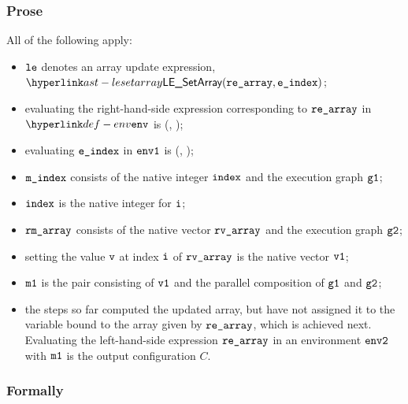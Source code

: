 \subsubsection{Prose}
All of the following apply:
\begin{itemize}
  \item $\vle$ denotes an array update expression, $\LESetArray(\rearray, \eindex)$;
  \item evaluating the right-hand-side expression corresponding to $\rearray$ in $\env$
  is \Normal(\rmarray, \envone)\ProseOrAbnormal;
  \item evaluating $\eindex$ in $\envone$ is \Normal(\mindex, \envtwo)\ProseOrAbnormal;
  \item $\mindex$ consists of the native integer $\vindex$ and the execution graph $\vgone$;
  \item $\vindex$ is the native integer for $\vi$;
  \item $\rmarray$ consists of the native vector $\rvarray$ and the execution graph $\vgtwo$;
  \item setting the value $\vv$ at index $\vi$ of $\rvarray$ is the native vector $\vvone$;
  \item $\vmone$ is the pair consisting of $\vvone$ and the parallel composition of $\vgone$ and $\vgtwo$;
  \item the steps so far computed the updated array, but have not assigned it to the variable
  bound to the array given by $\rearray$, which is achieved next.
  Evaluating the left-hand-side expression $\rearray$ in an environment $\envtwo$ with $\vmone$
  is the output configuration $C$.
\end{itemize}
\subsubsection{Formally}
\begin{mathpar}
\end{mathpar}

